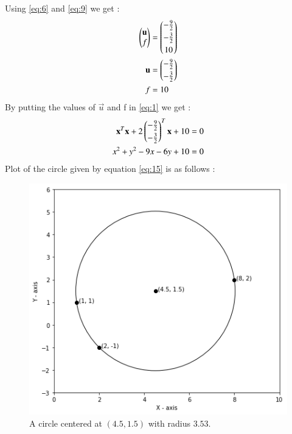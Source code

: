 \documentclass[journal,12pt,twocolumn]{IEEEtran}
\begin{document}
Using \eqref{eq:6} and \eqref{eq:9} we get : 
\begin{align}
\begin{pmatrix}\mathbf{u}\\f\end{pmatrix}&=\begin{pmatrix}-\frac{9}{2}\\[0.1cm]-\frac{3}{2}\\[0.1cm]10\end{pmatrix}\\
\mathbf{u}&=\begin{pmatrix}-\frac{9}{2}\\[0.1cm]-\frac{3}{2}\end{pmatrix}\\
f&=10   
\end{align}
By putting the values of $\vec{u}$ and f in \eqref{eq:1} we get : 
\begin{align}
\mathbf{x}^T\mathbf{x}+2\begin{pmatrix}-\frac{9}{2}\\[0.1cm]-\frac{3}{2}\end{pmatrix}^T\mathbf{x}+10&=0\label{eq:14}\\
x^2+y^2-9x-6y+10&=0\label{eq:15}
\end{align}
Plot of the circle given by equation \eqref{eq:15} is as follows :
\begin{figure}[h]
\centering
    \includegraphics[width=\columnwidth]{circle2.png}
    \caption{A circle centered at $(4.5, 1.5)$ with radius $3.53$.}
    \label{circle}
\end{figure}
\end{document}
